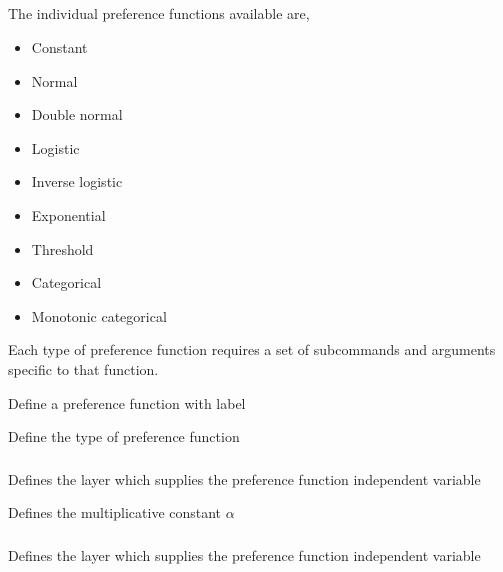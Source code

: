 \subsection{}

The individual preference functions available are,

\begin{itemize}
	\item Constant
	\item Normal
	\item Double normal
	\item Logistic
	\item Inverse logistic
	\item Exponential
	\item Threshold
	\item Categorical
	\item Monotonic categorical
\end{itemize}

Each type of preference function requires a set of subcommands and arguments specific to that function.

 {Define a preference function with label}

 {Define the type of preference function}

\subsubsection[Constant]{}

 {Defines the layer which supplies the preference function independent variable}

 {Defines the multiplicative constant $\alpha$}

\subsubsection[Normal]{}

 {Defines the layer which supplies the preference function independent variable}

